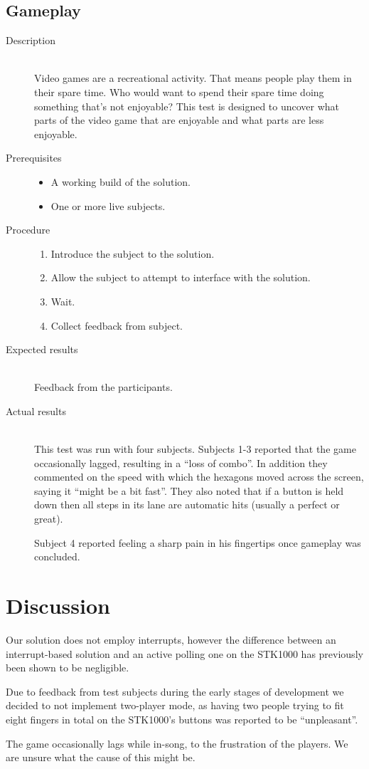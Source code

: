 \subsection{Gameplay}
	\begin{description}
		\item[Description] \hfill \\
			Video games are a recreational activity.
			That means people play them in their spare time.
			Who would want to spend their spare time doing something that's not enjoyable?
			This test is designed to uncover what parts of the video game that are enjoyable and what parts are less enjoyable.
		\item[Prerequisites] \hfill
			\begin{itemize}
				\item{A working build of the solution.}
				\item{One or more live subjects.}
			\end{itemize}
		\item[Procedure] \hfill
			\begin{enumerate}
				\item{Introduce the subject to the solution.}
				\item{Allow the subject to attempt to interface with the solution.}
				\item{Wait.}
				\item{Collect feedback from subject.}
			\end{enumerate}
		\item[Expected results] \hfill \\
			Feedback from the participants.
		\item[Actual results] \hfill \\
			This test was run with four subjects.
			Subjects 1-3 reported that the game occasionally lagged, resulting in a ``loss of combo''.
			In addition they commented on the speed with which the hexagons moved across the screen, saying it ``might be a bit fast''.
			They also noted that if a button is held down then all steps in its lane are automatic hits (usually a perfect or great).

			Subject 4 reported feeling a sharp pain in his fingertips once gameplay was concluded.
	\end{description}


\section{Discussion}
	Our solution does not employ interrupts, however the difference between an interrupt-based solution and an active polling one on the STK1000 has previously been shown to be negligible\cite{tdt4258-1}.

	Due to feedback from test subjects during the early stages of development we decided to not implement two-player mode, as having two people trying to fit eight fingers in total on the STK1000's buttons was reported to be ``unpleasant''.
	
	The game occasionally lags while in-song, to the frustration of the players.
	We are unsure what the cause of this might be.